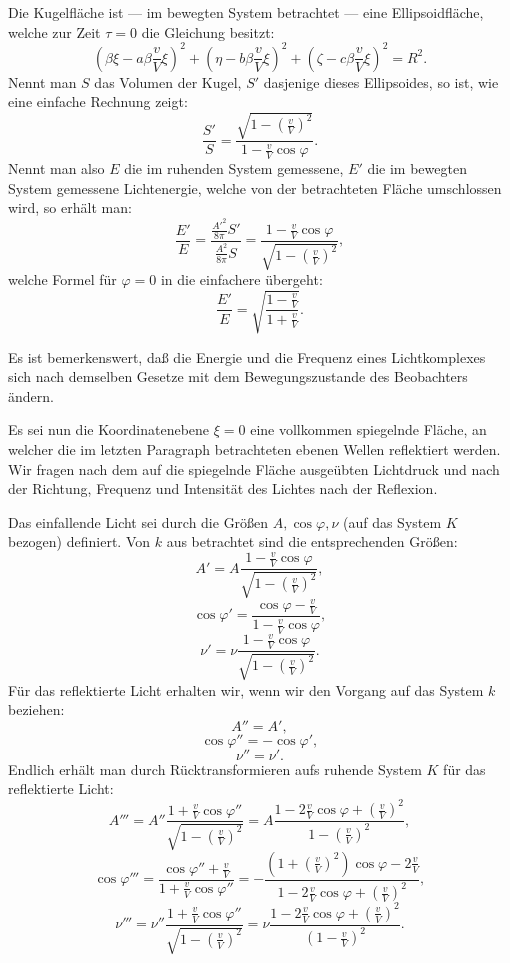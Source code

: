 \documentclass[17pt]{webarticle}       %
\begin{document}
Die Kugelfläche ist — im bewegten System betrachtet — eine Ellipsoidfläche, welche zur Zeit \( \tau = 0 \) die Gleichung besitzt:
\[
\left( \beta \xi - a \beta \frac{v}{V} \xi \right)^2 + \left( \eta - b \beta \frac{v}{V} \xi \right)^2 + \left( \zeta - c \beta \frac{v}{V} \xi \right)^2 = R^2.
\]
Nennt man \( S \) das Volumen der Kugel, \( S' \) dasjenige dieses Ellipsoides, so ist, wie eine einfache Rechnung zeigt:
\[
\frac{S'}{S} = \frac{\sqrt{1 - \left( \frac{v}{V} \right)^2}}{1 - \frac{v}{V} \cos \varphi}.
\]
Nennt man also \( E \) die im ruhenden System gemessene, \( E' \) die im bewegten System gemessene Lichtenergie, welche von der betrachteten Fläche umschlossen wird, so erhält man:
\[
\frac{E'}{E} = \frac{\frac{A'^2}{8\pi} S'}{\frac{A^2}{8\pi} S} = \frac{1 - \frac{v}{V} \cos \varphi}{\sqrt{1 - \left( \frac{v}{V} \right)^2}},
\]
welche Formel für \(\varphi = 0\) in die einfachere übergeht:
\[
\frac{E'}{E} = \sqrt{\frac{1 - \frac{v}{V}}{1 + \frac{v}{V}}}.
\]

Es ist bemerkenswert, daß die Energie und die Frequenz eines Lichtkomplexes sich nach demselben Gesetze mit dem Bewegungszustande des Beobachters ändern.

Es sei nun die Koordinatenebene \( \xi = 0 \) eine vollkommen spiegelnde Fläche, an welcher die im letzten Paragraph betrachteten ebenen Wellen reflektiert werden. Wir fragen nach dem auf die spiegelnde Fläche ausgeübten Lichtdruck und nach der Richtung, Frequenz und Intensität des Lichtes nach der Reflexion.

Das einfallende Licht sei durch die Größen \( A, \cos \varphi, \nu \) (auf das System \( K \) bezogen) definiert. Von \( k \) aus betrachtet sind die entsprechenden Größen:
\[
A' = A \frac{1 - \frac{v}{V} \cos \varphi}{\sqrt{1 - \left( \frac{v}{V} \right)^2}},
\]
\[
\cos \varphi' = \frac{\cos \varphi - \frac{v}{V}}{1 - \frac{v}{V} \cos \varphi},
\]
\[
\nu' = \nu \frac{1 - \frac{v}{V} \cos \varphi}{\sqrt{1 - \left( \frac{v}{V} \right)^2}}.
\]
Für das reflektierte Licht erhalten wir, wenn wir den Vorgang auf das System \( k \) beziehen:
\[
A'' = A',
\]
\[
\cos \varphi'' = - \cos \varphi',
\]
\[
\nu'' = \nu'.
\]
Endlich erhält man durch Rücktransformieren aufs ruhende System \( K \) für das reflektierte Licht:
\[
A''' = A'' \frac{1 + \frac{v}{V} \cos \varphi''}{\sqrt{1 - \left( \frac{v}{V} \right)^2}} = A \frac{1 - 2 \frac{v}{V} \cos \varphi + \left( \frac{v}{V} \right)^2}{1 - \left(\frac{v}{V}\right)^2},
\]
\[
\cos \varphi''' = \frac{\cos \varphi'' + \frac{v}{V}}{1 + \frac{v}{V} \cos \varphi''} = - \frac{\left( 1 + \left( \frac{v}{V} \right)^2 \right) \cos \varphi - 2 \frac{v}{V}}{1 - 2 \frac{v}{V} \cos \varphi + \left( \frac{v}{V} \right)^2},
\]
\[
\nu''' = \nu'' \frac{1 + \frac{v}{V} \cos \varphi''}{\sqrt{1 - \left( \frac{v}{V} \right)^2}} = \nu \frac{1 - 2 \frac{v}{V} \cos \varphi + \left( \frac{v}{V} \right)^2}{\left(1 - \frac{v}{V}\right)^2}.
\]
\end{document}
